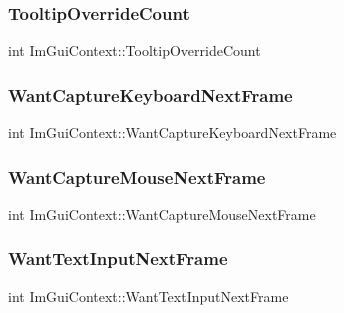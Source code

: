 \subsubsection{\texorpdfstring{Tooltip\+Override\+Count}{TooltipOverrideCount}}
{\footnotesize\ttfamily int Im\+Gui\+Context\+::\+Tooltip\+Override\+Count}

\hypertarget{struct_im_gui_context_a0372056c72eac8b3e6de06c404caa5b3}{}\label{struct_im_gui_context_a0372056c72eac8b3e6de06c404caa5b3} 
\subsubsection{\texorpdfstring{Want\+Capture\+Keyboard\+Next\+Frame}{WantCaptureKeyboardNextFrame}}
{\footnotesize\ttfamily int Im\+Gui\+Context\+::\+Want\+Capture\+Keyboard\+Next\+Frame}

\hypertarget{struct_im_gui_context_a7e7a9bbeaac9519abe29818ce6c2cc3b}{}\label{struct_im_gui_context_a7e7a9bbeaac9519abe29818ce6c2cc3b} 
\subsubsection{\texorpdfstring{Want\+Capture\+Mouse\+Next\+Frame}{WantCaptureMouseNextFrame}}
{\footnotesize\ttfamily int Im\+Gui\+Context\+::\+Want\+Capture\+Mouse\+Next\+Frame}

\hypertarget{struct_im_gui_context_abe551d35ea5c1aa61a4d5c785c8e0d9d}{}\label{struct_im_gui_context_abe551d35ea5c1aa61a4d5c785c8e0d9d} 
\subsubsection{\texorpdfstring{Want\+Text\+Input\+Next\+Frame}{WantTextInputNextFrame}}
{\footnotesize\ttfamily int Im\+Gui\+Context\+::\+Want\+Text\+Input\+Next\+Frame}

\hypertarget{struct_im_gui_context_a0f59a9a861d097be066c6cc106e40f3e}{}\label{struct_im_gui_context_a0f59a9a861d097be066c6cc106e40f3e} 
